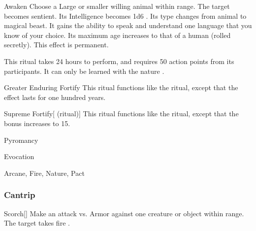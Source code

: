 \lowercase{\hypertarget{spell:Awaken}{}}\label{spell:Awaken}
\begin{apability}[\nth{5}]{\hypertarget{spell:Awaken}{Awaken}}
Choose a Large or smaller willing animal within \rngclose range.
The target becomes sentient.
Its Intelligence becomes 1d6 .
Its type changes from animal to magical beast.
It gains the ability to speak and understand one language that you know of your choice.
Its maximum age increases to that of a human (rolled secretly).
This effect is permanent.

This ritual takes 24 hours to perform, and requires 50 action points from its participants.
It can only be learned with the nature .
\end{apability}
\vspace{0.25em}



\lowercase{\hypertarget{spell:Greater Enduring Fortify}{}}\label{spell:Greater Enduring Fortify}
\begin{apability}[\nth{5}]{\hypertarget{spell:Greater Enduring Fortify}{Greater Enduring Fortify}}
This ritual functions like the  ritual, except that the effect lasts for one hundred years.
\end{apability}
\vspace{0.25em}



\lowercase{\hypertarget{spell:Supreme Fortify}{}}\label{spell:Supreme Fortify}
\begin{attuneability}[\nth{6}]{\hypertarget{spell:Supreme Fortify}{Supreme Fortify}}[ (ritual)]
This ritual functions like the  ritual, except that the  bonus increases to 15.
\end{attuneability}
\vspace{0.25em}


\newpage
\begin{spellsection}{Pyromancy}

\begin{spellheader}
\end{spellheader}


 Evocation

 Arcane, Fire, Nature, Pact

\subsubsection{Cantrip}


\begin{freeability}{Scorch}[]
Make an attack vs. Armor against one creature or object within \rngmed range.
\hit The target takes fire .
\end{freeability}

\end{spellsection}


